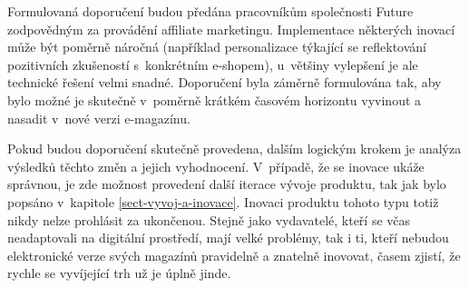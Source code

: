 \documentclass[12pt,oneside,openany]{fithesis}
\makeatletter
\def\cleardoublepage{\clearpage\if@twoside \ifodd\c@page\else
        \thispagestyle{empty}
        \hbox{}\newpage\if@twocolumn\hbox{}\newpage\fi\fi\fi}
\makeatother
\begin{document}
                          Formulovaná doporučení budou předána 
pracovníkům společnosti Future zodpovědným za provádění affiliate 
marketingu. Implementace některých inovací může být poměrně náročná 
(například personalizace týkající se reflektování pozitivních 
zkušeností s~konkrétním e-shopem), u~většiny vylepšení je ale 
technické řešení velmi snadné. Doporučení byla záměrně formulována 
tak, aby bylo možné je skutečně v~poměrně krátkém časovém horizontu 
vyvinout a nasadit v~nové verzi e-magazínu.

                          Pokud budou doporučení skutečně provedena, 
dalším logickým krokem je analýza výsledků těchto změn a jejich 
vyhodnocení. V~případě, že se inovace ukáže správnou, je zde možnost 
provedení další iterace vývoje produktu, tak jak bylo popsáno v~kapitole 
\hyperlink{sect-vyvoj-a-inovace}{{\ref{sect-vyvoj-a-inovace}}}. Inovaci 
produktu tohoto typu totiž nikdy nelze prohlásit za ukončenou. Stejně jako 
vydavatelé, kteří se včas neadaptovali na digitální prostředí, mají 
velké problémy, tak i ti, kteří nebudou elektronické verze svých 
magazínů pravidelně a znatelně inovovat, časem zjistí, že rychle se 
vyvíjející trh už je úplně jinde.

%									

										
										
\newpage\null\thispagestyle{empty}\newpage

\cleardoublepage
\renewcommand\bibname{Použitá literatura}
\end{document}
